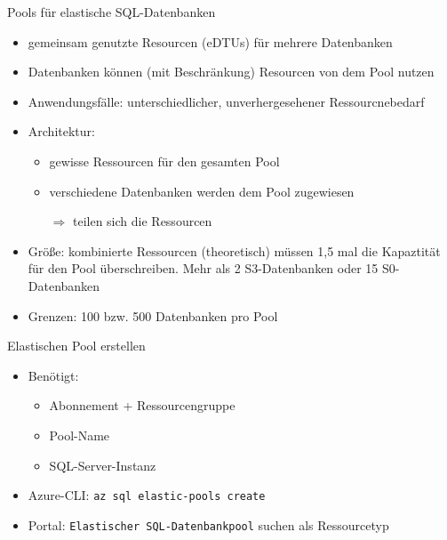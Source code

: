 
\begin{flashcard}[Definition]{Pools für elastische SQL-Datenbanken}
    \begin{itemize}
        \item gemeinsam genutzte Resourcen (eDTUs) für mehrere Datenbanken
        \item Datenbanken können (mit Beschränkung) Resourcen von dem Pool nutzen
        \item Anwendungsfälle: unterschiedlicher, unverhergesehener Ressourcnebedarf
        \item Architektur:
            \begin{itemize}
                \item gewisse Ressourcen für den gesamten Pool
                \item verschiedene Datenbanken werden dem Pool zugewiesen
                \item[$\Rightarrow$] teilen sich die Ressourcen
            \end{itemize}
        \item Größe: kombinierte Ressourcen (theoretisch) müssen 1,5 mal die Kapaztität für den Pool überschreiben. Mehr als 2 S3-Datenbanken oder 15 S0-Datenbanken
        \item Grenzen: 100 bzw. 500 Datenbanken pro Pool
    \end{itemize}
\end{flashcard}

\begin{flashcard}[Definition]{Elastischen Pool erstellen}
    \begin{itemize}
        \item Benötigt:
            \begin{itemize}
                \item Abonnement + Ressourcengruppe
                \item Pool-Name
                \item SQL-Server-Instanz
            \end{itemize}
        \item Azure-CLI:\newline
            \texttt{az sql elastic-pools create}
        \item Portal: \texttt{Elastischer SQL-Datenbankpool} suchen als Ressourcetyp
    \end{itemize}
\end{flashcard}

